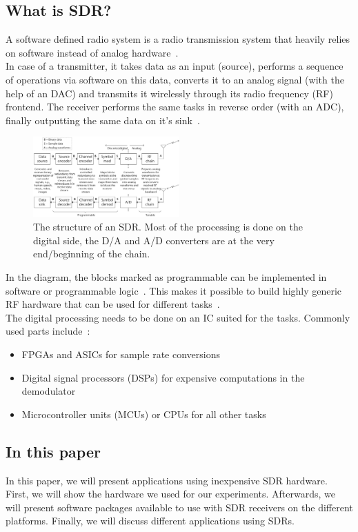\documentclass[conference]{IEEEtran}
\begin{document}
\subsection{What is SDR?}
A software defined radio system is a radio transmission system that heavily relies on software instead of analog hardware~\cite{Heuberger2017}.\\
In case of a transmitter, it takes data as an input (source), performs a sequence of operations via software on this data, converts it to an analog signal (with the help of an DAC) and transmits it wirelessly through its radio frequency (RF) frontend. The receiver performs the same tasks in reverse order (with an ADC), finally outputting the same data on it's sink~\cite[5pp]{wyglinski2018software}.
\begin{figure}[H]
	\centering
	\includegraphics[width=0.5\textwidth]{forEngineers_SDR_structure}
	\caption{The structure of an SDR. Most of the processing is done on the digital side, the D/A and A/D converters are at the very end/beginning of the chain.}
\end{figure}
In the diagram, the blocks marked as programmable can be implemented in software or programmable logic~\cite[5p]{wyglinski2018software}. This makes it possible to build highly generic RF hardware that can be used for different tasks~\cite[4p]{wyglinski2018software}.\\ 
The digital processing needs to be done on an IC suited for the tasks. Commonly used parts include~\cite[3p]{Heuberger2017}:
\begin{itemize}
	\item FPGAs and ASICs for sample rate conversions
	\item Digital signal processors (DSPs) for expensive computations in the demodulator
	\item Microcontroller units (MCUs) or CPUs for all other tasks
\end{itemize}
\subsection{In this paper}
In this paper, we will present applications using inexpensive SDR hardware.\\
First, we will show the hardware we used for our experiments. Afterwards, we will present software packages available to use with SDR receivers on the different platforms. Finally, we will discuss different applications using SDRs.
\end{document}
